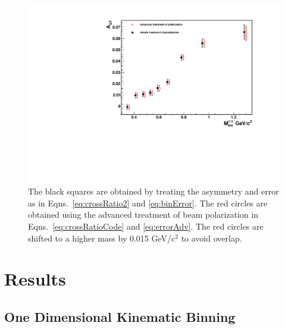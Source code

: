 \documentclass[letterpaper, abstract = on,listof=totoc, bibliography=totoc]{scrreprt}
\begin{document}
\begin{figure}
\begin{center}
\includegraphics[width = .7\textwidth]{advPolVsSimpPolForThesis}
\caption[Advanced Treatment of polarization error]{The black squares are obtained by treating the asymmetry and error as in Eqns.~\ref{eq:crossRatio2} and \ref{eq:binError}. The red circles are obtained using the advanced treatment of beam polarization in Eqns.~\ref{eq:crossRatioCode} and \ref{eq:errorAdv}. The red circles are shifted to a higher mass by 0.015 GeV/c$^2$ to avoid overlap.}
\label{fig:advPolTreat}
\end{center}
\end{figure}








 



















\chapter{Results}
\section{One Dimensional Kinematic Binning}
\end{document}
